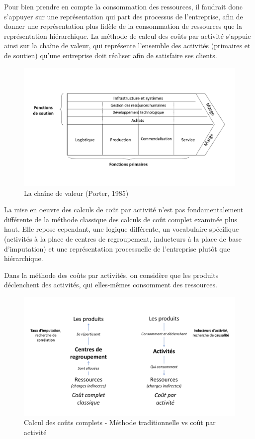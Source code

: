 \documentclass[oneside]{kaobook}
\begin{document}
Pour bien prendre en compte la consommation des ressources, il faudrait donc s'appuyer sur une représentation qui part des processus de l'entreprise, afin de donner une représentation plus fidèle de la consommation de ressources que la représentation hiérarchique. La méthode de calcul des coûts par activité s'appuie ainsi sur la chaîne de valeur, qui représente l'ensemble des activités (primaires et de soutien) qu'une entreprise doit réaliser afin de satisfaire ses clients.

\begin{figure}[H]

\includegraphics{./img/chaine.pdf}
\caption{La chaîne de valeur (Porter, 1985)}
\end{figure}

La mise en oeuvre des calculs de coût par activité n'est pas fondamentalement différente de la méthode classique des calculs de coût complet examinée plus haut. Elle repose cependant, une logique différente, un vocabulaire spécifique (activités à la place de centres de regroupement, inducteurs à la place de base d'imputation) et une représentation processuelle de l’entreprise plutôt que hiérarchique.

Dans la méthode des coûts par activités, on considère que les produits déclenchent des activités, qui elles-mêmes consomment des ressources. 

\begin{figure}[H]

\includegraphics{./img/abc.pdf}
\caption{Calcul des coûts complets - Méthode traditionnelle vs coût par activité}
\end{figure}
\end{document}

